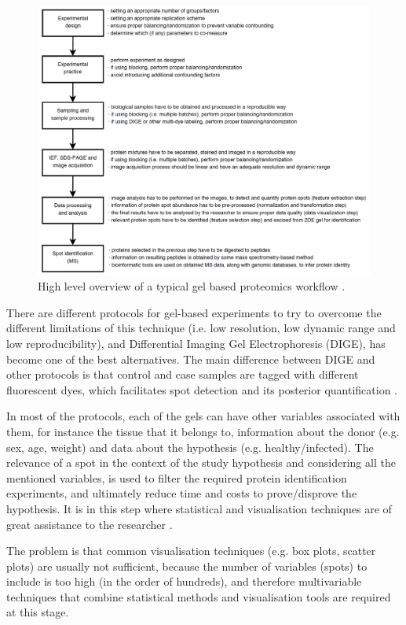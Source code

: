 \begin{figure}  
\centering
\includegraphics[width=\textwidth]{figures/gel-based.png}
\caption[High level overview of a typical gel based proteomics workflow.]{High level overview of a typical gel based proteomics workflow \cite{SIL2014}.
\label{fig:gelflow}}
\end{figure}

There are different protocols for gel-based experiments to try to overcome the different limitations of this technique (i.e. low resolution, low dynamic range and low reproducibility), and Differential Imaging Gel Electrophoresis (DIGE), has become one of the best alternatives. The main difference between DIGE and other protocols is that control and case samples are tagged with different fluorescent dyes, which facilitates spot detection and its posterior quantification \cite{PAN2008}.

In most of the protocols, each of the gels can have other variables associated with them, for instance the tissue that it belongs to, information about the donor (e.g. sex, age, weight) and data about the hypothesis (e.g. healthy/infected). The relevance of a spot in the context of the study hypothesis and considering all the mentioned variables, is used to filter the required protein identification experiments, and ultimately reduce time and costs to prove/disprove the hypothesis. It is in this step where statistical and visualisation techniques are of great assistance to the researcher \cite{SIL2014}.

The problem is that common visualisation techniques (e.g. box plots, scatter plots) are usually not sufficient, because the number of variables (spots) to include is too high (in the order of hundreds), and therefore multivariable techniques that combine statistical methods and visualisation tools are required at this stage.


